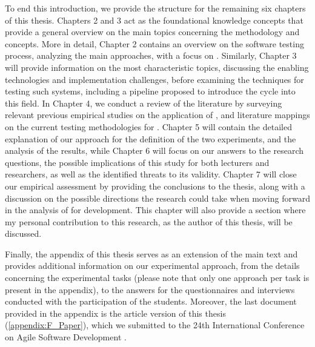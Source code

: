 To end this introduction, we provide the structure for the remaining six chapters of this thesis.
Chapters 2 and 3 act as the foundational knowledge concepts that provide a general overview on the main topics concerning the \tdd methodology and \ess concepts. 
More in detail, Chapter 2 contains an overview on the software testing process, analyzing the main approaches, with a focus on \tdd. 
Similarly, Chapter 3 will provide information on the most characteristic \ess topics, discussing the enabling technologies and implementation challenges, before examining the techniques for testing such systems, including a pipeline proposed to introduce the \tdd cycle into this field.
In Chapter 4, we conduct a review of the literature by surveying relevant previous empirical studies on the application of \tdd, and literature mappings on the current testing methodologies for \ess.
Chapter 5 will contain the detailed explanation of our approach for the definition of the two experiments, and the analysis of the results, while Chapter 6 will focus on our answers to the research questions, the possible implications of this study for both lecturers and researchers, as well as the identified threats to its validity.
Chapter 7 will close our empirical assessment by providing the conclusions to the thesis, along with a discussion on the possible directions the research could take when moving forward in the analysis of \tdd for \es development. This chapter will also provide a section where my personal contribution to this research, as the author of this thesis, will be discussed.

Finally, the appendix of this thesis serves as an extension of the main text and provides additional information on our experimental approach, from the details concerning the experimental tasks (please note that only one approach per task is present in the appendix), to the answers for the questionnaires and interviews conducted with the participation of the students. 
Moreover, the last document provided in the appendix is the article version of this thesis (\ref{appendix:F_Paper}), which we submitted to the 24th International Conference on Agile Software Development \cite{XP2023}.